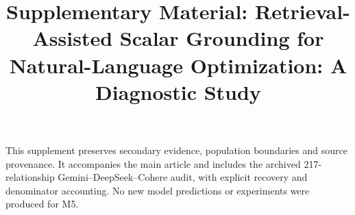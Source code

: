 \documentclass[pdflatex,sn-basic,Numbered]{sn-jnl}
\begin{document}
\title[Supplement: Scalar Grounding]{Supplementary Material: Retrieval-Assisted Scalar Grounding for Natural-Language Optimization: A Diagnostic Study}
\author*[1]{ }
\maketitle
\renewcommand{\thesection}{S\arabic{section}}
\renewcommand{\thetable}{S\arabic{table}}
\renewcommand{\thefigure}{S\arabic{figure}}
\renewcommand{\theequation}{S\arabic{equation}}
This supplement preserves secondary evidence, population boundaries and source provenance. It accompanies the main article and includes the archived 217-relationship Gemini--DeepSeek--Cohere audit, with explicit recovery and denominator accounting. No new model predictions or experiments were produced for M5.
\FloatBarrier
\end{document}
